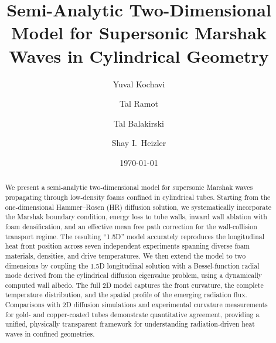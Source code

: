\documentclass[prl, twocolumn, superscriptaddress, amsmath, amssymb, reprint]{revtex4-2}
\begin{document}
\title{Semi-Analytic Two-Dimensional Model for Supersonic Marshak Waves in Cylindrical Geometry}

\author{Yuval Kochavi}

\author{Tal Ramot}

\author{Tal Balakirski}

\author{Shay I.~Heizler}

\date{\today}

\begin{abstract}
We present a semi-analytic two-dimensional model for supersonic Marshak waves propagating through low-density foams confined in cylindrical tubes.
Starting from the one-dimensional Hammer--Rosen (HR) diffusion solution, we systematically incorporate the Marshak boundary condition, energy loss to tube walls, inward wall ablation with foam densification, and an effective mean free path correction for the wall-collision transport regime.
The resulting ``1.5D'' model accurately reproduces the longitudinal heat front position across seven independent experiments spanning diverse foam materials, densities, and drive temperatures.
We then extend the model to two dimensions by coupling the 1.5D longitudinal solution with a Bessel-function radial mode derived from the cylindrical diffusion eigenvalue problem, using a dynamically computed wall albedo.
The full 2D model captures the front curvature, the complete temperature distribution, and the spatial profile of the emerging radiation flux.
Comparisons with 2D diffusion simulations and experimental curvature measurements for gold- and copper-coated tubes demonstrate quantitative agreement, providing a unified, physically transparent framework for understanding radiation-driven heat waves in confined geometries.
\end{abstract}
\end{document}
